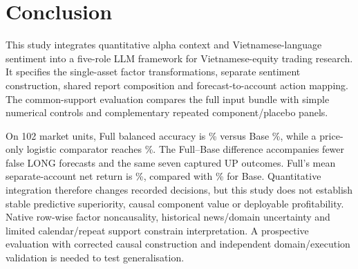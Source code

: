 \section{Conclusion}
\label{sec:conclusion}

This study integrates quantitative alpha context and Vietnamese-language sentiment into a five-role LLM framework for Vietnamese-equity trading research. It specifies the single-asset factor transformations, separate sentiment construction, shared report composition and forecast-to-account action mapping. The common-support evaluation compares the full input bundle with simple numerical controls and complementary repeated component/placebo panels.

On 102 market units, Full balanced accuracy is \FullBA\% versus Base \BaseBA\%, while a price-only logistic comparator reaches \LogisticPriceBA\%. The Full--Base difference accompanies fewer false LONG forecasts and the same seven captured UP outcomes. Full's mean separate-account net return is \FullReturn\%, compared with \BaseReturn\% for Base. Quantitative integration therefore changes recorded decisions, but this study does not establish stable predictive superiority, causal component value or deployable profitability. Native row-wise factor noncausality, historical news/domain uncertainty and limited calendar/repeat support constrain interpretation. A prospective evaluation with corrected causal construction and independent domain/execution validation is needed to test generalisation.

